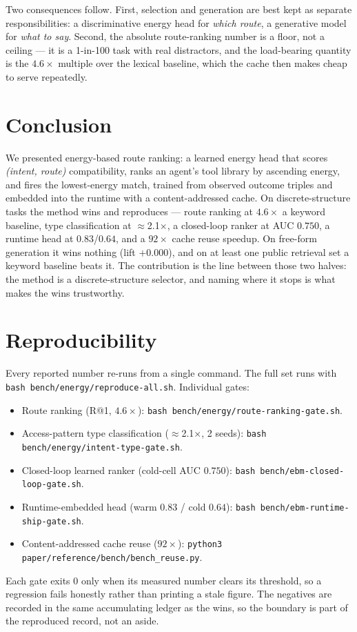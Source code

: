 \documentclass[11pt]{article}
\begin{document}
Two consequences follow. First, selection and generation are best kept as separate
responsibilities: a discriminative energy head for \emph{which route}, a generative
model for \emph{what to say}. Second, the absolute route-ranking number is a floor,
not a ceiling --- it is a 1-in-100 task with real distractors, and the load-bearing
quantity is the $4.6\times$ multiple over the lexical baseline, which the cache then
makes cheap to serve repeatedly.

\section{Conclusion}
We presented energy-based route ranking: a learned energy head that scores
\emph{(intent, route)} compatibility, ranks an agent's tool library by ascending
energy, and fires the lowest-energy match, trained from observed outcome triples and
embedded into the runtime with a content-addressed cache. On discrete-structure tasks
the method wins and reproduces --- route ranking at $4.6\times$ a keyword baseline,
type classification at $\approx$2.1$\times$, a closed-loop ranker at AUC $0.750$, a
runtime head at $0.83$/$0.64$, and a $92\times$ cache reuse speedup. On free-form
generation it wins nothing (lift $+0.000$), and on at least one public retrieval set
a keyword baseline beats it. The contribution is the line between those two halves:
the method is a discrete-structure selector, and naming where it stops is what makes
the wins trustworthy.

\appendix
\section{Reproducibility}
\label{app:repro}
Every reported number re-runs from a single command. The full set runs with
\texttt{bash bench/energy/reproduce-all.sh}. Individual gates:
\begin{itemize}[leftmargin=1.6em]
  \item Route ranking (R@1, $4.6\times$): \texttt{bash bench/energy/route-ranking-gate.sh}.
  \item Access-pattern type classification ($\approx$2.1$\times$, 2 seeds):
  \texttt{bash bench/energy/intent-type-gate.sh}.
  \item Closed-loop learned ranker (cold-cell AUC $0.750$):
  \texttt{bash bench/ebm-closed-loop-gate.sh}.
  \item Runtime-embedded head (warm $0.83$ / cold $0.64$):
  \texttt{bash bench/ebm-runtime-ship-gate.sh}.
  \item Content-addressed cache reuse ($92\times$):
  \texttt{python3 paper/reference/bench/bench\_reuse.py}.
\end{itemize}
Each gate exits $0$ only when its measured number clears its threshold, so a
regression fails honestly rather than printing a stale figure. The negatives are
recorded in the same accumulating ledger as the wins, so the boundary is part of the
reproduced record, not an aside.
\end{document}
